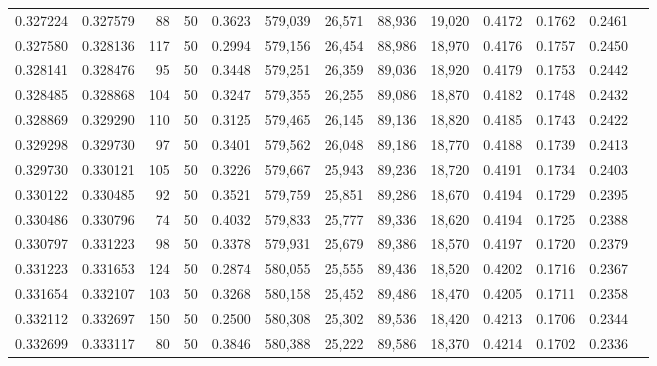 \begin{tabular}{rrrrrrrrrrrrr}
0.327224 & 0.327579 &    88 &  50 &                                     0.3623 & 579,039 &  26,571 &  88,936 &  19,020 & 0.4172 & 0.1762 & 0.2461 \\
0.327580 & 0.328136 &   117 &  50 &                                     0.2994 & 579,156 &  26,454 &  88,986 &  18,970 & 0.4176 & 0.1757 & 0.2450 \\
0.328141 & 0.328476 &    95 &  50 &                                     0.3448 & 579,251 &  26,359 &  89,036 &  18,920 & 0.4179 & 0.1753 & 0.2442 \\
0.328485 & 0.328868 &   104 &  50 &                                     0.3247 & 579,355 &  26,255 &  89,086 &  18,870 & 0.4182 & 0.1748 & 0.2432 \\
0.328869 & 0.329290 &   110 &  50 &                                     0.3125 & 579,465 &  26,145 &  89,136 &  18,820 & 0.4185 & 0.1743 & 0.2422 \\
0.329298 & 0.329730 &    97 &  50 &                                     0.3401 & 579,562 &  26,048 &  89,186 &  18,770 & 0.4188 & 0.1739 & 0.2413 \\
0.329730 & 0.330121 &   105 &  50 &                                     0.3226 & 579,667 &  25,943 &  89,236 &  18,720 & 0.4191 & 0.1734 & 0.2403 \\
0.330122 & 0.330485 &    92 &  50 &                                     0.3521 & 579,759 &  25,851 &  89,286 &  18,670 & 0.4194 & 0.1729 & 0.2395 \\
0.330486 & 0.330796 &    74 &  50 &                                     0.4032 & 579,833 &  25,777 &  89,336 &  18,620 & 0.4194 & 0.1725 & 0.2388 \\
0.330797 & 0.331223 &    98 &  50 &                                     0.3378 & 579,931 &  25,679 &  89,386 &  18,570 & 0.4197 & 0.1720 & 0.2379 \\
0.331223 & 0.331653 &   124 &  50 &                                     0.2874 & 580,055 &  25,555 &  89,436 &  18,520 & 0.4202 & 0.1716 & 0.2367 \\
0.331654 & 0.332107 &   103 &  50 &                                     0.3268 & 580,158 &  25,452 &  89,486 &  18,470 & 0.4205 & 0.1711 & 0.2358 \\
0.332112 & 0.332697 &   150 &  50 &                                     0.2500 & 580,308 &  25,302 &  89,536 &  18,420 & 0.4213 & 0.1706 & 0.2344 \\
0.332699 & 0.333117 &    80 &  50 &                                     0.3846 & 580,388 &  25,222 &  89,586 &  18,370 & 0.4214 & 0.1702 & 0.2336 \\

\end{tabular}
